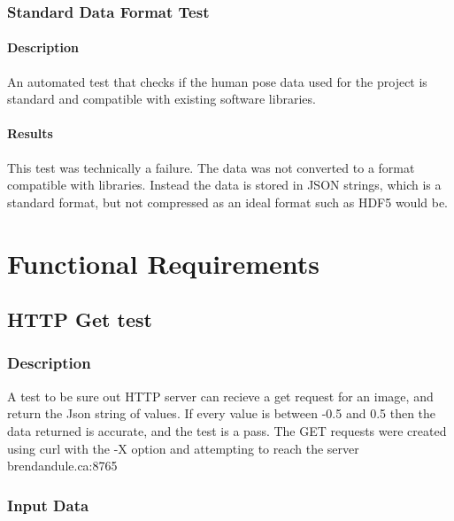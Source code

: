 \documentclass{scrreprt}
\begin{document}
\subsection{Standard Data Format Test}

\subsubsection{Description}

An automated test that checks if the human pose data used for the project is
standard and compatible with existing software libraries.

\subsubsection{Results}

This test was technically a failure. The data was not converted to a format
compatible with libraries. Instead the data is stored in JSON strings, which is
a standard format, but not compressed as an ideal format such as HDF5 would be.

\chapter{Functional Requirements}

\section{HTTP Get test}

\subsection{Description}

A test to be sure out HTTP server can recieve a get request for an image, and return the Json string of values. If every value is between -0.5 and 0.5 then the data returned is accurate, and the test is a pass. The GET requests were created using curl with the -X option and attempting to reach the server brendandule.ca:8765
\subsection{Input Data}
\end{document}
